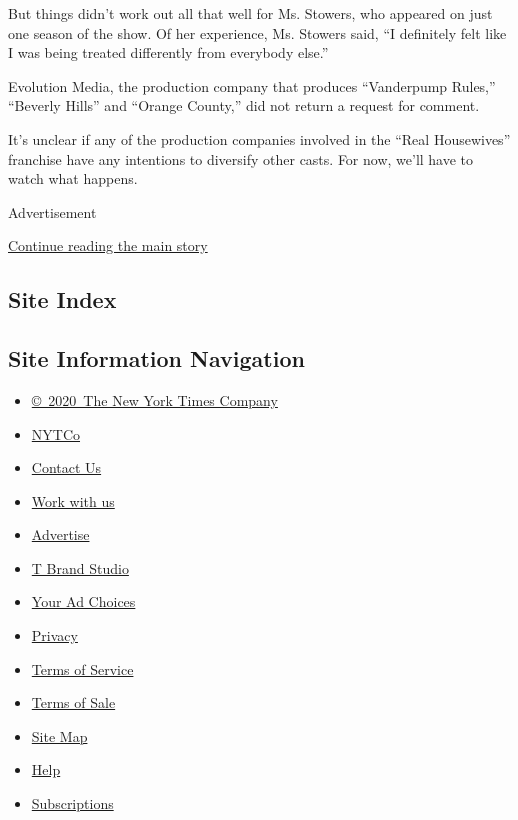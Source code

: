 But things didn't work out all that well for Ms. Stowers, who appeared
on just one season of the show. Of her experience, Ms. Stowers said, ``I
definitely felt like I was being treated differently from everybody
else.''

Evolution Media, the production company that produces ``Vanderpump
Rules,'' ``Beverly Hills'' and ``Orange County,'' did not return a
request for comment.

It's unclear if any of the production companies involved in the ``Real
Housewives'' franchise have any intentions to diversify other casts. For
now, we'll have to watch what happens.

Advertisement

\protect\hyperlink{after-bottom}{Continue reading the main story}

\hypertarget{site-index}{%
\subsection{Site Index}\label{site-index}}

\hypertarget{site-information-navigation}{%
\subsection{Site Information
Navigation}\label{site-information-navigation}}

\begin{itemize}
\tightlist
\item
  \href{https://help.nytimes.com/hc/en-us/articles/115014792127-Copyright-notice}{©~2020~The
  New York Times Company}
\end{itemize}

\begin{itemize}
\tightlist
\item
  \href{https://www.nytco.com/}{NYTCo}
\item
  \href{https://help.nytimes.com/hc/en-us/articles/115015385887-Contact-Us}{Contact
  Us}
\item
  \href{https://www.nytco.com/careers/}{Work with us}
\item
  \href{https://nytmediakit.com/}{Advertise}
\item
  \href{http://www.tbrandstudio.com/}{T Brand Studio}
\item
  \href{https://www.nytimes.com/privacy/cookie-policy\#how-do-i-manage-trackers}{Your
  Ad Choices}
\item
  \href{https://www.nytimes.com/privacy}{Privacy}
\item
  \href{https://help.nytimes.com/hc/en-us/articles/115014893428-Terms-of-service}{Terms
  of Service}
\item
  \href{https://help.nytimes.com/hc/en-us/articles/115014893968-Terms-of-sale}{Terms
  of Sale}
\item
  \href{https://spiderbites.nytimes.com}{Site Map}
\item
  \href{https://help.nytimes.com/hc/en-us}{Help}
\item
  \href{https://www.nytimes.com/subscription?campaignId=37WXW}{Subscriptions}
\end{itemize}
